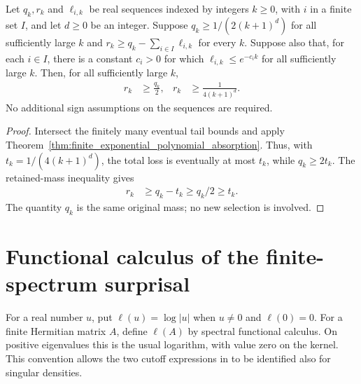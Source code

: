 \begin{theorem}
\label{thm:half_mass_after_finite_exponential_losses}
    \leanok
{}
Let $q_k,r_k$ and $\ell_{i,k}$ be real sequences indexed by integers
$k\ge0$, with $i$ in a finite set $I$, and let $d\ge0$ be an integer.
Suppose $q_k\ge 1/(2(k+1)^d)$ for all sufficiently large $k$ and
$r_k\ge q_k-\sum_{i\in I}\ell_{i,k}$ for every $k$.
Suppose also that, for each $i\in I$, there is a constant $c_i>0$ for which
$\ell_{i,k}\le e^{-c_i k}$ for all sufficiently large $k$.
Then, for all sufficiently large $k$,
\begin{align}
 r_k&\ge\frac{q_k}{2},
 &r_k&\ge\frac{1}{4(k+1)^d}.
\end{align}
No additional sign assumptions on the sequences are required.
\end{theorem}
\begin{proof}
    \leanok
Intersect the finitely many eventual tail bounds and apply Theorem~\ref{thm:finite_exponential_polynomial_absorption}. Thus, with $t_k=1/(4(k+1)^d)$, the total loss is eventually at
most $t_k$, while $q_k\ge2t_k$. The retained-mass inequality gives
\begin{align}
 r_k&\ge q_k-t_k\ge q_k/2\ge t_k.
\end{align}
The quantity $q_k$ is the same original mass; no new selection is involved.
\end{proof}

\section{Functional calculus of the finite-spectrum surprisal}
\label{sec:surprisal_functional_calculus}

For a real number $u$, put $\ell(u)=\log|u|$ when $u\ne0$ and
$\ell(0)=0$. For a finite Hermitian matrix $A$, define $\ell(A)$ by
spectral functional calculus. On positive eigenvalues this is the usual
logarithm, with value zero on the kernel. This convention allows the
two cutoff expressions in \cite[Section~7]{OpenAI2026AreaLaw} to be
identified also for singular densities.

